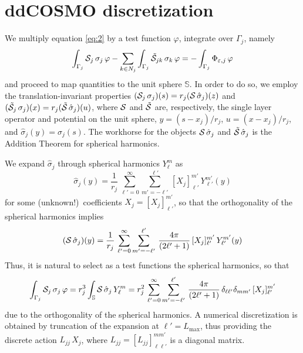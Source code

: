 \section{ddCOSMO discretization \label{app:mats}}
We multiply equation \eqref{eq:2} by a test function $\varphi$, integrate over $\Gamma_j$, namely
\begin{equation}\label{eq:50}
\int_{\Gamma_j} \mathcal{S}_j \, \sigma_j \, \varphi - \sum_{k \in N_j} \int_{\Gamma_j} \tilde{\mathcal{S}}_{jk} \, \sigma_k \, \varphi = -\int_{\Gamma_j}  \Phi_{\varepsilon,j} \, \varphi
\end{equation}
and proceed to map quantities to the unit sphere $\mathbb{S}$. In order to do so, we employ the translation-invariant properties $(\mathcal{S}_j \, \sigma_j)(s) = r_j( \mathcal{S} \, \hat{\sigma}_j)(z)$ and $(\tilde{\mathcal{S}}_j \, \sigma_j)(x) = r_j( \tilde{\mathcal{S}} \, \hat{\sigma}_j)(u)$, where $\mathcal{S}$ and $\tilde{\mathcal{S}}$ are, respectively, the single layer operator and potential on the unit sphere, $y = (s - x_j)/r_j$, $u = (x - x_j)/r_j$, and $\hat{\sigma}_j(y) = \sigma_j(s)$. The workhorse for the objects $\mathcal{S} \, \hat{\sigma}_j$ and $\tilde{\mathcal{S}} \, \hat{\sigma}_j$ is the Addition Theorem for spherical harmonics.

We expand $\hat{\sigma}_j$ through spherical harmonics $Y_\ell^m$ as
\[
\hat{\sigma}_j(y) = \frac{1}{r_j} \, \sum_{\ell'= 0}^{\infty} \sum_{m' = -\ell'}^{\ell'} \,  [X_j]_{\ell'}^{m'} \, Y_{\ell'}^{m'}(y)
\]
for some (unknown!)~coefficients $X_j = [X_j]_{\ell'}^{m'}$, so that the orthogonality of the spherical harmonics implies
\[
(\mathcal{S} \, \hat{\sigma}_j)(y) = \frac{1}{r_j} \, \sum_{\ell'= 0}^{\infty} \sum_{m' = -\ell'}^{\ell'} \, \frac{4\pi}{(2\ell' + 1)}\, [X_j]_{\ell'}^{m'} \, Y_{\ell'}^{m'}(y)
\]
Thus, it is natural to select as a test functions the spherical harmonics, so that
\begin{equation}\label{eq:51}
\int_{\Gamma_j} \mathcal{S}_j \, \sigma_j \, \varphi =  r_j^3 \int_\mathbb{S} \mathcal{S} \, \hat{\sigma}_j \, Y_\ell^m = r_j^2 \, \sum_{\ell'= 0}^{\infty} \sum_{m' = -\ell'}^{\ell'} \, \frac{4\pi}{(2\ell' + 1)} \, \delta_{\ell \ell'} \delta_{m m'}\, [X_j]_{\ell'}^{m'} 
\end{equation}
due to the orthogonality of the spherical harmonics. A numerical discretization is obtained by truncation of the expansion at $\ell'=L_\text{max}$, thus providing the discrete action $L_{jj} \, X_j$, where $L_{jj} = [L_{jj}]_{\ell \ell'}^{m m'}$ is a diagonal matrix.

